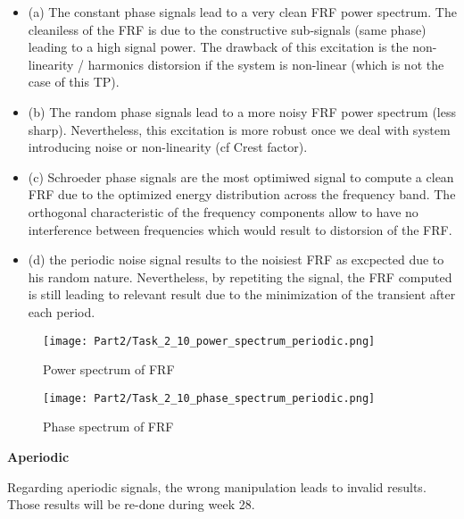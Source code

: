 \begin{itemize}
    \item (a) The constant phase signals lead to a very clean FRF power spectrum.  The cleaniless of the FRF is due to the
    constructive sub-signals (same phase) leading to a high signal power.  The drawback of this excitation is the non-linearity / harmonics 
    distorsion if the system is non-linear (which is not the case of this TP).
    \item (b) The random phase signals lead to a more noisy FRF power spectrum (less sharp).  Nevertheless, this excitation is more robust once
    we deal with system introducing noise or non-linearity (cf Crest factor).
    \item (c) Schroeder phase signals are the most optimiwed signal to compute a clean FRF due to the optimized energy distribution across the frequency band.
    The orthogonal characteristic of the frequency components allow to have no interference between frequencies which would result to distorsion of the FRF.
    \item (d) the periodic noise signal results to the noisiest FRF as excpected due to his random nature.  Nevertheless, by repetiting the signal, the
    FRF computed is still leading to relevant result due to the minimization of the transient after each period.

\end{itemize}

\begin{figure}[H]
    \centering
    \texttt{[image: Part2/Task\_2\_10\_power\_spectrum\_periodic.png]}
    \caption{Power spectrum of FRF}
    \label{Power spectrum periodic signal}
\end{figure}

\begin{figure}[H]
    \centering
    \texttt{[image: Part2/Task\_2\_10\_phase\_spectrum\_periodic.png]}
    \caption{Phase spectrum of FRF}
    \label{Phase spectrum periodic signal}
\end{figure}

\textbf{Aperiodic}

Regarding aperiodic signals, the wrong manipulation leads to invalid results.
Those results will be re-done during week 28.






